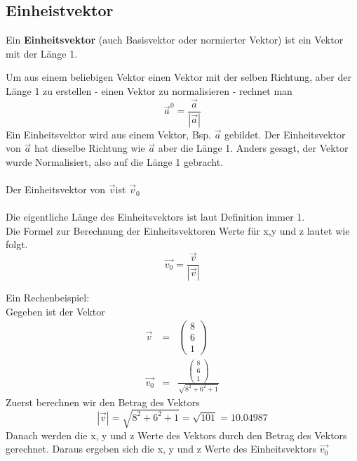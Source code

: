 \subsection{Einheistvektor}
\begin{mydef}Ein \textbf{Einheitsvektor} (auch Basisvektor oder normierter Vektor) ist ein Vektor mit der Länge 1. \end{mydef}
\noindent Um aus einem beliebigen Vektor einen Vektor mit der selben Richtung, aber der Länge 1 zu erstellen - einen Vektor zu normalisieren - rechnet man
\begin{equation*} 
\vec{a}^0 = \frac{\vec{a}}{|\vec{a}|}
\end{equation*}
Ein Einheitsvektor wird aus einem Vektor, Bsp. $\vec{a}$ gebildet. Der Einheitsvektor von $\vec{a}$ hat dieselbe Richtung wie $\vec{a}$ aber die Länge 1. Anders gesagt, der Vektor wurde Normalisiert, also auf die Länge 1 gebracht.\\
\\
Der Einheitsvektor von $\vec{v} $ist $\vec{v}_0$ \\
\\
Die eigentliche Länge des Einheitsvektors ist laut Definition immer 1.\\
Die Formel zur Berechnung der Einheitsvektoren Werte für x,y und z lautet wie folgt. \\
\begin{equation*}
	\vec{v_0} =  \frac{\vec{v}}{|\vec{v}|} 
\end{equation*}

Ein Rechenbeispiel:\\
Gegeben ist der Vektor
\begin{eqnarray*}
	\vec{v} &=& \begin{pmatrix}8\\6\\1\end{pmatrix}\\
	\vec{v_0} &=& \frac{\begin{pmatrix}8\\6\\1\end{pmatrix}}{\sqrt{8^2+6^2+1}}
\end{eqnarray*}
Zuerst berechnen wir den Betrag des Vektors
\begin{equation*}
	|\vec{v}|= \sqrt{8^2+6^2+1}  = \sqrt{101} =10.04987
\end{equation*}
Danach werden die x, y und z Werte des Vektors durch den Betrag des Vektors gerechnet. Daraus ergeben sich die x, y und z Werte des Einheitsvektors $\vec{v_0}$

